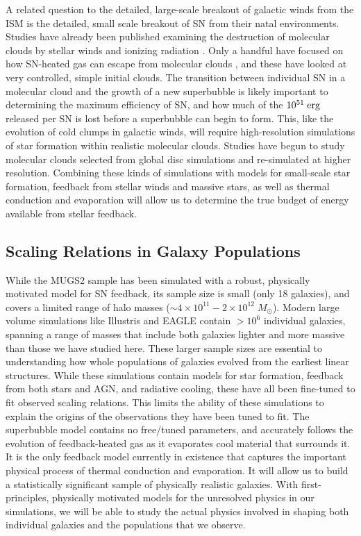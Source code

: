 A related question to the detailed, large-scale breakout of galactic winds from
the ISM is the detailed, small scale breakout of SN from their natal
environments.  Studies have already been published examining the destruction of
molecular clouds by stellar winds and ionizing radiation
\citep{Murray2010,Walch2012}.  Only a handful have focused on how SN-heated gas
can escape from molecular clouds \citep{Rogers2013}, and these have looked at
very controlled, simple initial clouds.  The transition between individual
SN in a molecular cloud and the growth of a new superbubble is likely
important to determining the maximum efficiency of SN, and how much 
of the $10^{51}\;\rm{erg}$ released per SN is lost before a superbubble can begin
to form.  This, like the evolution of cold clumps in galactic winds, will
require high-resolution simulations of star formation within realistic molecular
clouds.  Studies have begun \citep{Dobbs2015} to study molecular clouds selected
from global disc simulations and re-simulated at higher resolution.  Combining
these kinds of simulations with models for small-scale star formation, feedback
from stellar winds and massive stars, as well as thermal conduction and
evaporation will allow us to determine the true budget of energy available from
stellar feedback.

\subsection{Scaling Relations in Galaxy Populations}
While the MUGS2 sample has been simulated with a robust, physically motivated
model for SN feedback, its sample size is small (only 18 galaxies), and covers a
limited range of halo masses ($\sim 4\times10^{11}-2\times10^{12}\;M_\odot$).
Modern large volume simulations like Illustris \citep{Vogelsberger2014b} and
EAGLE \citep{Schaye2015} contain $>10^6$ individual galaxies, spanning a range
of masses that include both galaxies lighter and more massive than those we have
studied here.  These larger sample sizes are essential to understanding how
whole populations of galaxies evolved from the earliest linear structures.
While these simulations contain models for star formation, feedback from both
stars and AGN, and radiative cooling, these have all been fine-tuned to
fit observed scaling relations.  This limits the ability of these simulations to
explain the origins of the observations they have been tuned to fit.  The
superbubble model contains no free/tuned parameters, and accurately follows the
evolution of feedback-heated gas as it evaporates cool material that surrounds
it.  It is the only feedback model currently in existence that captures the
important physical process of thermal conduction and evaporation.  It will allow
us to build a statistically significant sample of physically realistic galaxies.
With first-principles, physically motivated models for the unresolved physics in
our simulations, we will be able to study the actual physics involved in shaping
both individual galaxies and the populations that we observe. 


